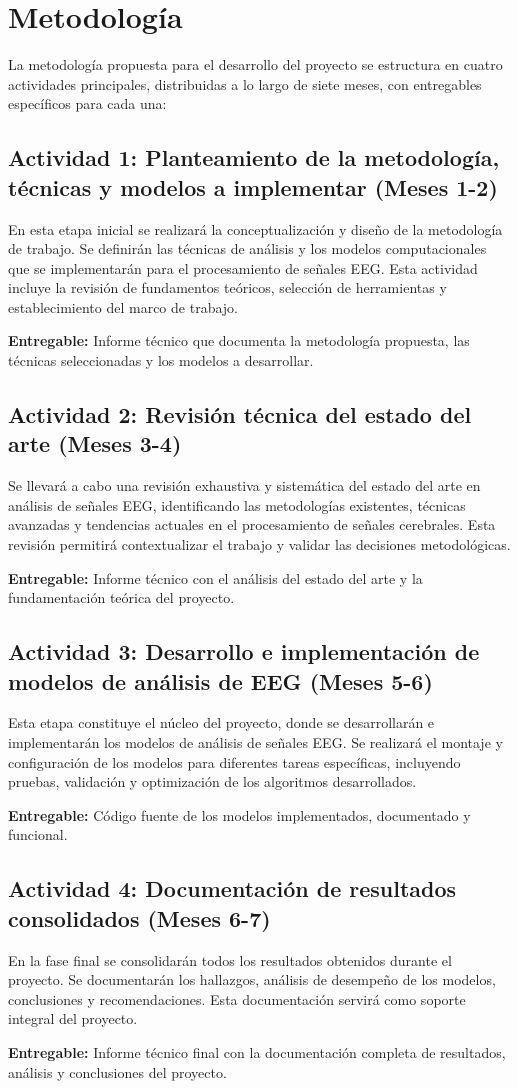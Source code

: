 \section{Metodología}
La metodología propuesta para el desarrollo del proyecto se estructura en cuatro actividades principales, distribuidas a lo largo de siete meses, con entregables específicos para cada una:

\subsection{Actividad 1: Planteamiento de la metodología, técnicas y modelos a implementar (Meses 1-2)}
En esta etapa inicial se realizará la conceptualización y diseño de la metodología de trabajo. Se definirán las técnicas de análisis y los modelos computacionales que se implementarán para el procesamiento de señales EEG. Esta actividad incluye la revisión de fundamentos teóricos, selección de herramientas y establecimiento del marco de trabajo.

\textbf{Entregable:} Informe técnico que documenta la metodología propuesta, las técnicas seleccionadas y los modelos a desarrollar.

\subsection{Actividad 2: Revisión técnica del estado del arte (Meses 3-4)}
Se llevará a cabo una revisión exhaustiva y sistemática del estado del arte en análisis de señales EEG, identificando las metodologías existentes, técnicas avanzadas y tendencias actuales en el procesamiento de señales cerebrales. Esta revisión permitirá contextualizar el trabajo y validar las decisiones metodológicas.

\textbf{Entregable:} Informe técnico con el análisis del estado del arte y la fundamentación teórica del proyecto.

\subsection{Actividad 3: Desarrollo e implementación de modelos de análisis de EEG (Meses 5-6)}
Esta etapa constituye el núcleo del proyecto, donde se desarrollarán e implementarán los modelos de análisis de señales EEG. Se realizará el montaje y configuración de los modelos para diferentes tareas específicas, incluyendo pruebas, validación y optimización de los algoritmos desarrollados.

\textbf{Entregable:} Código fuente de los modelos implementados, documentado y funcional.

\subsection{Actividad 4: Documentación de resultados consolidados (Meses 6-7)}
En la fase final se consolidarán todos los resultados obtenidos durante el proyecto. Se documentarán los hallazgos, análisis de desempeño de los modelos, conclusiones y recomendaciones. Esta documentación servirá como soporte integral del proyecto.

\textbf{Entregable:} Informe técnico final con la documentación completa de resultados, análisis y conclusiones del proyecto.
